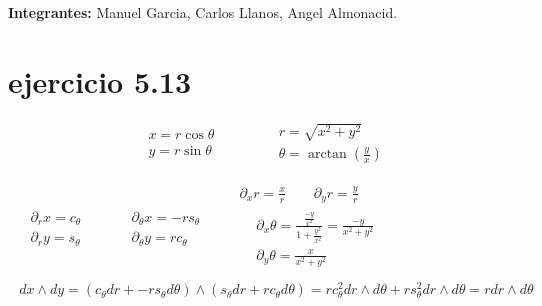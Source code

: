 \documentclass{article}
\begin{document}
\textbf{Integrantes: }Manuel Garcia, Carlos Llanos, Angel Almonacid.

\hfill


\section{ejercicio 5.13 }
\[
\begin{aligned}
  & x = r\cos{\theta} \\ 
  & y = r\sin{\theta}
\end{aligned} \quad \quad \quad \begin{aligned} & r = \sqrt{ x^2 + y^2 } \\ & \theta = \arctan{ \left( \frac{y}{x} \right) } \end{aligned}
\]

\[
\begin{gathered}
  \begin{aligned}
    & \partial_r x = c_{\theta} \\ 
    & \partial_r y = s_{\theta} 
  \end{aligned} \quad \quad \begin{aligned}
    & \partial_{\theta} x = -rs_{\theta} \\ 
    & \partial_{\theta} y = rc_{\theta}
\end{aligned} \quad \quad \begin{aligned}
    \partial_x r = \frac{x}{r} \quad \quad \partial_y r = \frac{y}{r} \\
    \begin{aligned}
      & \partial_x \theta = \frac{ \frac{-y}{x^2} }{ 1 + \frac{y^2}{x^2} } = \frac{-y}{ x^2 + y^2 } \\
      & \partial_y \theta = \frac{x}{ x^2 + y^2 }
\end{aligned}
\end{aligned} \\
\begin{aligned}
  dx \wedge dy = (c_{\theta} dr + - rs_{\theta} d\theta ) \wedge (s_{\theta}dr + rc_{\theta} d\theta ) = rc_{\theta}^2 dr \wedge d\theta + rs_{\theta}^2 dr \wedge d\theta = rdr \wedge d\theta
\end{aligned}
\end{gathered}
\]
\end{document}
